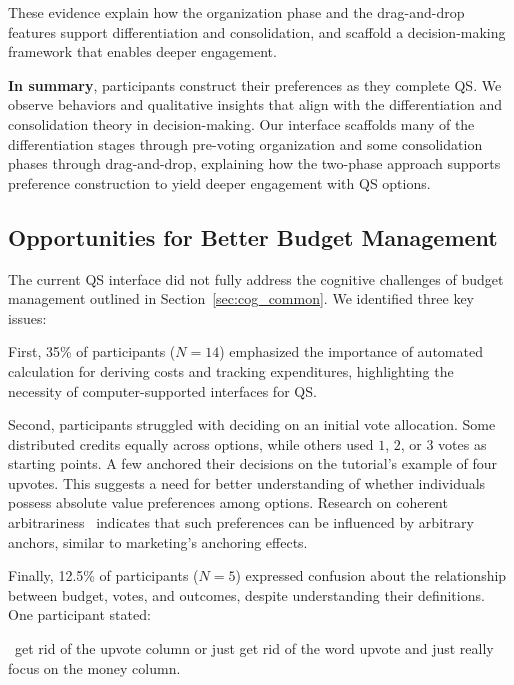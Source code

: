 These evidence explain how the organization phase and the drag-and-drop features support differentiation and consolidation, and scaffold a decision-making framework that enables deeper engagement.  

\textbf{In summary}, participants construct their preferences as they complete QS. We observe behaviors and qualitative insights that align with the differentiation and consolidation theory in decision-making. Our interface scaffolds many of the differentiation stages through pre-voting organization and some consolidation phases through drag-and-drop, explaining how the two-phase approach supports preference construction to yield deeper engagement with QS options.  

\subsection{Opportunities for Better Budget Management}
The current QS interface did not fully address the cognitive challenges of budget management outlined in Section~\ref{sec:cog_common}. We identified three key issues:

First, 35\% of participants ($N=14$) emphasized the importance of automated calculation for deriving costs and tracking expenditures, highlighting the necessity of computer-supported interfaces for QS.

Second, participants struggled with deciding on an initial vote allocation. Some distributed credits equally across options, while others used $1$, $2$, or $3$ votes as starting points. A few anchored their decisions on the tutorial’s example of four upvotes. This suggests a need for better understanding of whether individuals possess absolute value preferences among options. Research on coherent arbitrariness~\cite{arielyCoherentArbitrarinessStable2003} indicates that such preferences can be influenced by arbitrary anchors, similar to marketing’s anchoring effects.

Finally, 12.5\% of participants ($N=5$) expressed confusion about the relationship between budget, votes, and outcomes, despite understanding their definitions. One participant stated:

\begin{displayquote}
~\bracketellipsis get rid of the upvote column or just get rid of the word upvote and just really focus on the money column.~\bracketellipsis \hfill{}
\end{displayquote}

